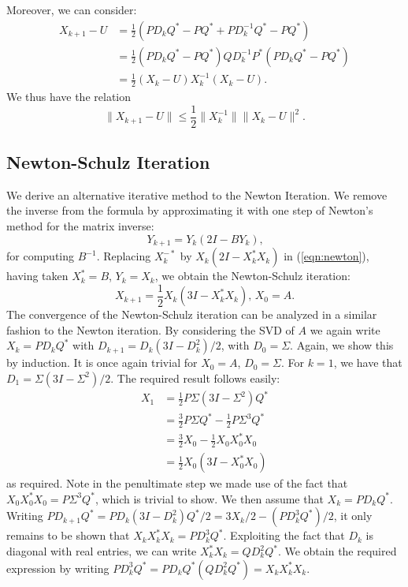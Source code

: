 \documentclass[12pt]{article}
\def\norm#1{\|#1\|}
\begin{document}
Moreover, we can consider:
\begin{align*}
  X_{k+1} - U & = \frac{1}{2}(PD_kQ^* - PQ^* + PD_k^{-1}Q^* - PQ^*) \\
  & = \frac{1}{2}(PD_kQ^* - PQ^*)QD_k^{-1}P^*(PD_kQ^* - PQ^*)\\
  & = \frac{1}{2}(X_k - U)X_k^{-1}(X_k - U)\text{.}
\end{align*}
We thus have the relation
\begin{equation}
  \norm{X_{k+1} - U} \leq \frac{1}{2}\norm{X_k^{-1}}\norm{X_k - U}^2\text{.}
\end{equation}

\subsection{Newton-Schulz Iteration}
We derive an alternative iterative method to the Newton Iteration. We remove
the inverse from the formula by approximating it with one step of Newton's
method for the matrix inverse:
\begin{equation}
  Y_{k+1} = Y_k(2I - BY_k)\text{,}
\end{equation}
for computing $B^{-1}$. Replacing $X_k^{-*}$ by $X_k(2I - X_k^*X_k)$ in
(\ref{eqn:newton}), having taken $X_k^* = B$, $Y_k = X_k$, we obtain the
Newton-Schulz iteration:
\begin{equation}
  X_{k+1} = \frac{1}{2}X_k(3I - X_k^*X_k)\text{, } X_0 = A\text{.}
\end{equation}
The convergence of the Newton-Schulz iteration can be analyzed in a similar
fashion to the Newton iteration. By considering the SVD of $A$ we again write
$X_k = PD_kQ^*$ with $D_{k+1} = D_k(3I - D_k^2)/2$, with $D_0 = \Sigma$. Again,
we show this by induction. It is once again trivial for $X_0 = A$,
$D_0 = \Sigma$. For $k = 1$, we have that $D_1 = \Sigma(3I - \Sigma^2)/2$. The
required result follows easily:
\begin{align*}
  X_{1} & = \frac{1}{2}P\Sigma(3I-\Sigma^2)Q^* \\
       & = \frac{3}{2}P\Sigma Q^* - \frac{1}{2}P\Sigma^3Q^* \\
       & = \frac{3}{2}X_0 - \frac{1}{2}X_0X_0^*X_0 \\
       & = \frac{1}{2}X_0(3I - X_0^*X_0)
\end{align*}
as required.
Note in the penultimate step we made use of the fact that
$X_0X_0^*X_0 = P\Sigma^3Q^*$, which is trivial to show. We then assume that
$X_k = PD_kQ^*$. Writing
$PD_{k+1}Q^* = PD_k(3I - D_k^2)Q^*/2 = 3X_k/2 - (PD_k^3Q^*)/2$, it only remains
to be shown that $X_kX_k^*X_k = PD_k^3Q^*$. Exploiting the fact that $D_k$ is
diagonal with real entries, we can write $X_k^*X_k = QD_k^2Q^*$. We obtain the
required expression by writing $PD_k^3Q^* = PD_kQ^*(QD_k^2Q^*) = X_kX_k^*X_k$.
\end{document}
